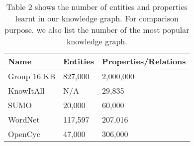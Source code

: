 \documentclass[11pt,twocolumn]{article}
\begin{document}
\begin{center}
\begin{table}[b]
\begin{tabular}{|l|l|l|}
\hline
\textbf{Name} & \textbf{Entities} & \textbf{Properties/Relations} \\ \hline
Group 16 KB & 827,000             & 2,000,000                    \\ \hline
KnowItAll     & N/A               & 29,835                        \\ \hline
SUMO          & 20,000            & 60,000                        \\ \hline
WordNet       & 117,597           & 207,016                       \\ \hline
OpenCyc       & 47,000            & 306,000                       \\ \hline
\end{tabular}

\caption{Table 2 shows the number of entities and properties learnt in our knowledge graph. For comparison purpose, we also list the number of the most popular knowledge graph.}
\end{table}
\end{center}
\end{document}
